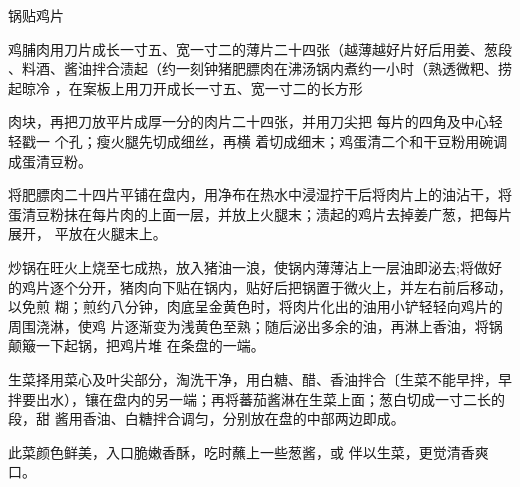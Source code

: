 \begin{recipe}{锅贴鸡片}

\ingredients


\preparation

\step 鸡脯肉用刀片成长一寸五、宽一寸二的薄片二十四张（越薄越好片好后用姜、葱段
、料酒、酱油拌合渍起（约一刻钟猪肥膘肉在沸汤锅内煮约一小时（熟透微粑、捞起晾冷
，在案板上用刀开成长一寸五、宽一寸二的长方形

肉块，再把刀放平片成厚一分的肉片二十四张，并用刀尖把 每片的四角及中心轻轻戳一
个孔；瘦火腿先切成细丝，再横 着切成细末；鸡蛋清二个和干豆粉用碗调成蛋清豆粉。

\step 将肥膘肉二十四片平铺在盘内，用净布在热水中浸湿拧干后将肉片上的油沾干，将
蛋清豆粉抹在每片肉的上面一层，并放上火腿末；渍起的鸡片去掉姜广葱，把每片展开，
平放在火腿末上。

\step 炒锅在旺火上烧至七成热，放入猪油一浪，使锅内薄薄沾上一层油即泌去;将做好
的鸡片逐个分开，猪肉向下贴在锅内，贴好后把锅置于微火上，并左右前后移动，以免煎
糊；煎约八分钟，肉底呈金黄色时，将肉片化出的油用小铲轻轻向鸡片的周围浇淋，使鸡
片逐渐变为浅黄色至熟；随后泌出多余的油，再淋上香油，将锅颠簸一下起锅，把鸡片堆
在条盘的一端。

\step 生菜择用菜心及叶尖部分，淘洗干净，用白糖、醋、香油拌合〔生菜不能早拌，早
拌要出水），镶在盘内的另一端；再将蕃茄酱淋在生菜上面；葱白切成一寸二长的段，甜
酱用香油、白糖拌合调匀，分别放在盘的中部两边即成。

\features

此菜颜色鲜美，入口脆嫩香酥，吃时蘸上一些葱酱，或 伴以生菜，更觉清香爽口。

\end{recipe}

